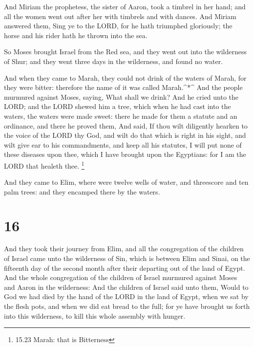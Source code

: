  And Miriam the prophetess, the sister of Aaron, took a
timbrel in her hand; and all the women went out after her with timbrels
and with dances.  And Miriam answered them, Sing ye to the
LORD, for he hath triumphed gloriously; the horse and his rider hath he
thrown into the sea.

 So Moses brought Israel from the Red sea, and they went
out into the wilderness of Shur; and they went three days in the
wilderness, and found no water.

 And when they came to Marah, they could not drink of the
waters of Marah, for they were bitter: therefore the name of it was
called Marah.\^{}*\^{}  And the people murmured against
Moses, saying, What shall we drink?  And he cried unto the
LORD; and the LORD shewed him a tree, which when he had cast into the
waters, the waters were made sweet: there he made for them a statute and
an ordinance, and there he proved them,  And said, If thou
wilt diligently hearken to the voice of the LORD thy God, and wilt do
that which is right in his sight, and wilt give ear to his commandments,
and keep all his statutes, I will put none of these diseases upon thee,
which I have brought upon the Egyptians: for I am the LORD that healeth
thee. \footnote{15.23 Marah: that is Bitterness}

 And they came to Elim, where were twelve wells of water,
and threescore and ten palm trees: and they encamped there by the
waters.

\hypertarget{section-15}{%
\section{16}\label{section-15}}

 And they took their journey from Elim, and all the
congregation of the children of Israel came unto the wilderness of Sin,
which is between Elim and Sinai, on the fifteenth day of the second
month after their departing out of the land of Egypt.  And
the whole congregation of the children of Israel murmured against Moses
and Aaron in the wilderness:  And the children of Israel
said unto them, Would to God we had died by the hand of the LORD in the
land of Egypt, when we sat by the flesh pots, and when we did eat bread
to the full; for ye have brought us forth into this wilderness, to kill
this whole assembly with hunger.

